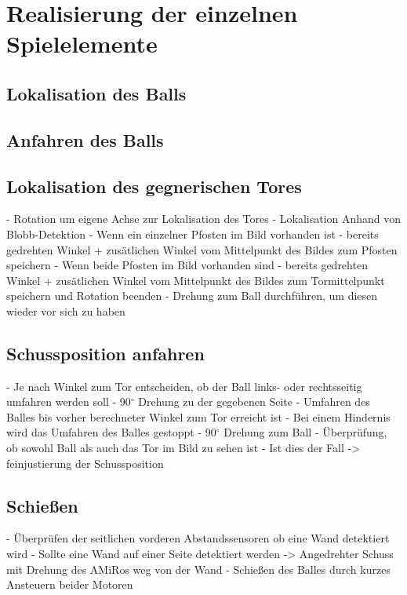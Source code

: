 \section{Realisierung der einzelnen Spielelemente} %

\subsection{Lokalisation des Balls} %

\subsection{Anfahren des Balls} %

\subsection{Lokalisation des gegnerischen Tores} %
- Rotation um eigene Achse zur Lokalisation des Tores
- Lokalisation Anhand von Blobb-Detektion 
- Wenn ein einzelner Pfosten im Bild vorhanden ist - bereits gedrehten Winkel + zusätlichen Winkel vom Mittelpunkt des Bildes zum Pfosten speichern
- Wenn beide Pfosten im Bild vorhanden sind - bereits gedrehten Winkel + zusätlichen Winkel vom Mittelpunkt des Bildes zum Tormittelpunkt speichern und Rotation beenden
- Drehung zum Ball durchführen, um diesen wieder vor sich zu haben

\subsection{Schussposition anfahren} %
- Je nach Winkel zum Tor entscheiden, ob der Ball links- oder rechtsseitig umfahren werden soll
- 90$^\circ$ Drehung zu der gegebenen Seite 
- Umfahren des Balles bis vorher berechneter Winkel zum Tor erreicht ist
	- Bei einem Hindernis wird das Umfahren des Balles gestoppt
- 90$^\circ$ Drehung zum Ball
- Überprüfung, ob sowohl Ball als auch das Tor im Bild zu sehen ist 
	- Ist dies der Fall -> feinjustierung der Schussposition 

\subsection{Schießen} %
- Überprüfen der seitlichen vorderen Abstandssensoren ob eine Wand detektiert wird
	- Sollte eine Wand auf einer Seite detektiert werden -> Angedrehter Schuss mit Drehung des AMiRos weg von der Wand
- Schießen des Balles durch kurzes Ansteuern beider Motoren 

